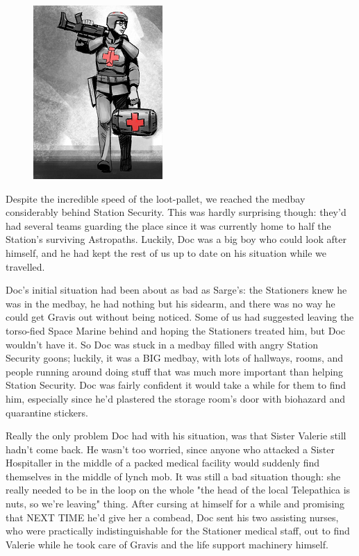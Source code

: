 \begin{figure}
	\begin{center}
		\includegraphics[width=\figwidth]{pics/14/31.png}
	\end{center}
\end{figure}
Despite the incredible speed of the loot-pallet, we reached the medbay considerably behind Station Security. 
This was hardly surprising though: 
they'd had several teams guarding the place since it was currently home to half the Station's surviving Astropaths. 
Luckily, Doc was a big boy who could look after himself, and he had kept the rest of us up to date on his situation while we travelled.

Doc's initial situation had been about as bad as Sarge's: 
the Stationers knew he was in the medbay, he had nothing but his sidearm, and there was no way he could get Gravis out without being noticed. 
Some of us had suggested leaving the torso-fied Space Marine behind and hoping the Stationers treated him, but Doc wouldn't have it. 
So Doc was stuck in a medbay filled with angry Station Security goons; 
luckily, it was a BIG medbay, with lots of hallways, rooms, and people running around doing stuff that was much more important than helping Station Security. 
Doc was fairly confident it would take a while for them to find him, especially since he'd plastered the storage room's door with biohazard and quarantine stickers.

Really the only problem Doc had with his situation, was that Sister Valerie still hadn't come back. 
He wasn't too worried, since anyone who attacked a Sister Hospitaller in the middle of a packed medical facility would suddenly find themselves in the middle of lynch mob. 
It was still a bad situation though: 
she really needed to be in the loop on the whole "the head of the local Telepathica is nuts, so we're leaving" thing. 
After cursing at himself for a while and promising that NEXT TIME he'd give her a combead, Doc sent his two assisting nurses, who were practically indistinguishable for the Stationer medical staff, out to find Valerie while he took care of Gravis and the life support machinery himself.

